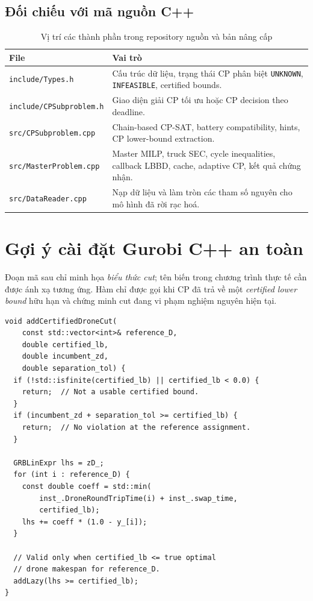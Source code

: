 \documentclass[11pt,a4paper]{article}
\theoremstyle{definition}
\theoremstyle{plain}
\theoremstyle{remark}
\begin{document}
\subsection{Đối chiếu với mã nguồn C++}
\begin{table}[htbp]
\centering\small
\caption{Vị trí các thành phần trong repository nguồn và bản nâng cấp}
\begin{tabular}{p{50mm}p{96mm}}
\toprule
\textbf{File} & \textbf{Vai trò}\\\midrule
\texttt{include/Types.h} & Cấu trúc dữ liệu, trạng thái CP phân biệt \texttt{UNKNOWN}, \texttt{INFEASIBLE}, certified bounds.\\
\texttt{include/CPSubproblem.h} & Giao diện giải CP tối ưu hoặc CP decision theo deadline.\\
\texttt{src/CPSubproblem.cpp} & Chain-based CP-SAT, battery compatibility, hints, CP lower-bound extraction.\\
\texttt{src/MasterProblem.cpp} & Master MILP, truck SEC, cycle inequalities, callback LBBD, cache, adaptive CP, kết quả chứng nhận.\\
\texttt{src/DataReader.cpp} & Nạp dữ liệu và làm tròn các tham số nguyên cho mô hình đã rời rạc hoá.\\
\bottomrule
\end{tabular}
\end{table}

\section{Gợi ý cài đặt Gurobi C++ an toàn}
Đoạn mã sau chỉ minh họa \emph{biểu thức cut}; tên biến trong chương trình thực tế cần được ánh xạ tương ứng. Hàm chỉ được gọi khi CP đã trả về một \emph{certified lower bound} hữu hạn và chứng minh cut đang vi phạm nghiệm nguyên hiện tại.

\begin{lstlisting}[style=cppsimple,caption={Separation of a certified Lipschitz-type cut}]
void addCertifiedDroneCut(
    const std::vector<int>& reference_D,
    double certified_lb,
    double incumbent_zd,
    double separation_tol) {
  if (!std::isfinite(certified_lb) || certified_lb < 0.0) {
    return;  // Not a usable certified bound.
  }
  if (incumbent_zd + separation_tol >= certified_lb) {
    return;  // No violation at the reference assignment.
  }

  GRBLinExpr lhs = zD_;
  for (int i : reference_D) {
    const double coeff = std::min(
        inst_.DroneRoundTripTime(i) + inst_.swap_time,
        certified_lb);
    lhs += coeff * (1.0 - y_[i]);
  }

  // Valid only when certified_lb <= true optimal
  // drone makespan for reference_D.
  addLazy(lhs >= certified_lb);
}
\end{lstlisting}
\end{document}
